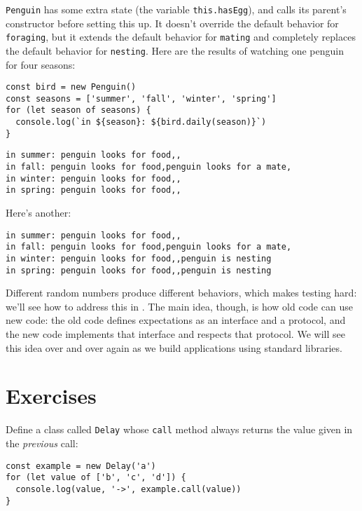 \texttt{Penguin} has some extra state (the variable \texttt{this.hasEgg}),
and calls its parent's constructor before setting this up.
It doesn't override the default behavior for \texttt{foraging},
but it extends the default behavior for \texttt{mating}
and completely replaces the default behavior for \texttt{nesting}.
Here are the results of watching one penguin for four seasons:

\begin{verbatim}
const bird = new Penguin()
const seasons = ['summer', 'fall', 'winter', 'spring']
for (let season of seasons) {
  console.log(`in ${season}: ${bird.daily(season)}`)
}
\end{verbatim}

\begin{verbatim}
in summer: penguin looks for food,,
in fall: penguin looks for food,penguin looks for a mate,
in winter: penguin looks for food,,
in spring: penguin looks for food,,
\end{verbatim}

\noindent
Here's another:

\begin{verbatim}
in summer: penguin looks for food,,
in fall: penguin looks for food,penguin looks for a mate,
in winter: penguin looks for food,,penguin is nesting
in spring: penguin looks for food,,penguin is nesting
\end{verbatim}

Different random numbers produce different behaviors,
which makes testing hard:
we'll see how to address this in .
The main idea,
though,
is how old code can use new code:
the old code defines expectations as an interface and a protocol,
and the new code implements that interface and respects that protocol.
We will see this idea over and over again
as we build applications using standard libraries.

\section{Exercises}\label{s:oop-exercises}


Define a class called \texttt{Delay} whose \texttt{call} method always returns
the value given in the \emph{previous} call:

\begin{verbatim}
const example = new Delay('a')
for (let value of ['b', 'c', 'd']) {
  console.log(value, '->', example.call(value))
}
\end{verbatim}

